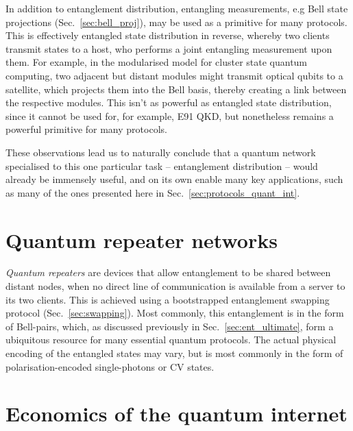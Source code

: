 \documentclass[aps, rmp, twocolumn, amsmath, amssymb, nofootinbib, superscriptaddress, longbibliography, floatfix, table-of-contents, eqsecnum]{revtex4-1}
\newcommand{\comment}[1]{{\color{blue}{\textbf{#1}}}}
\begin{document}
\comment{Any other advantages?}

In addition to entanglement distribution, entangling measurements, e.g Bell state projections (Sec.~\ref{sec:bell_proj}), may be used as a primitive for many protocols. This is effectively entangled state distribution in reverse, whereby two clients transmit states to a host, who performs a joint entangling measurement upon them. For example, in the modularised model for cluster state quantum computing, two adjacent but distant modules might transmit optical qubits to a satellite, which projects them into the Bell basis, thereby creating a link between the respective modules. This isn't as powerful as entangled state distribution, since it cannot be used for, for example, E91 QKD, but nonetheless remains a powerful primitive for many protocols.

These observations lead us to naturally conclude that a quantum network specialised to this one particular task -- entanglement distribution -- would already be immensely useful, and on its own enable many key applications, such as many of the ones presented here in Sec.~\ref{sec:protocols_quant_int}.

%
%

\section{Quantum repeater networks} \label{sec:rep_net} 

\textit{Quantum repeaters} are devices that allow entanglement to be shared between distant nodes, when no direct line of communication is available from a server to its two clients. This is achieved using a bootstrapped entanglement swapping protocol (Sec.~\ref{sec:swapping}). Most commonly, this entanglement is in the form of Bell-pairs, which, as discussed previously in Sec.~\ref{sec:ent_ultimate}, form a ubiquitous resource for many essential quantum protocols. The actual physical encoding of the entangled states may vary, but is most commonly in the form of polarisation-encoded single-photons or CV states.

\comment{To do by Bill Munro}

%
%

\section{Economics of the quantum internet} 
\end{document}
